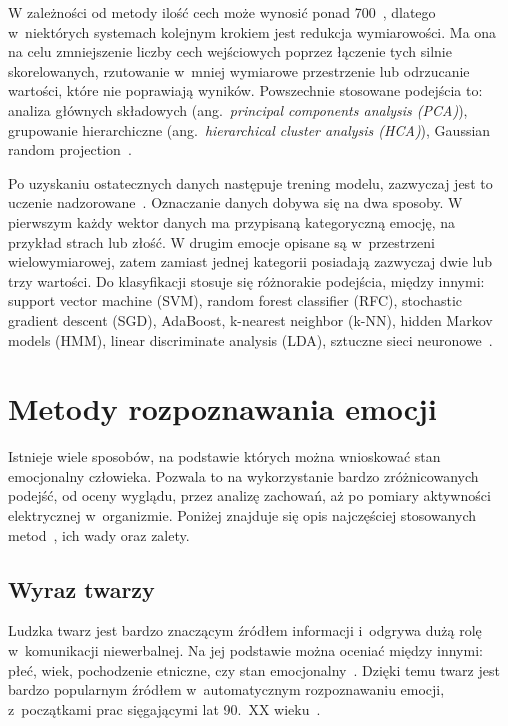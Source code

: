 W zależności od metody ilość cech może wynosić ponad 700~\cite{Wood2022}, dlatego w~niektórych systemach kolejnym krokiem jest redukcja wymiarowości.
Ma ona na celu zmniejszenie liczby cech wejściowych poprzez łączenie tych silnie skorelowanych, rzutowanie w~mniej wymiarowe przestrzenie lub odrzucanie wartości, które nie poprawiają wyników.
Powszechnie stosowane podejścia to: analiza głównych składowych (ang.~\textit{principal components analysis (PCA)}), grupowanie hierarchiczne (ang.~\textit{hierarchical cluster analysis (HCA)}), Gaussian random projection~\cite{Geron2019}.

Po uzyskaniu ostatecznych danych następuje trening modelu, zazwyczaj jest to uczenie nadzorowane~\cite{Russell2020}.
Oznaczanie danych dobywa się na dwa sposoby.
W pierwszym każdy wektor danych ma przypisaną kategoryczną emocję, na przykład strach lub złość.
W drugim emocje opisane są w~przestrzeni wielowymiarowej, zatem zamiast jednej kategorii posiadają zazwyczaj dwie lub trzy wartości.
Do klasyfikacji stosuje się różnorakie podejścia, między innymi: support vector machine (SVM), random forest classifier (RFC), stochastic gradient descent (SGD), AdaBoost, k-nearest neighbor (k-NN), hidden Markov models (HMM), linear discriminate analysis (LDA), sztuczne sieci neuronowe~\cite{Varghese2015, Dzedzickis2020, Ko2018}.

\section{Metody rozpoznawania emocji}
\label{sec:metody-rozpoznawania-emocji}

Istnieje wiele sposobów, na podstawie których można wnioskować stan emocjonalny człowieka.
Pozwala to na wykorzystanie bardzo zróżnicowanych podejść, od oceny wyglądu, przez analizę zachowań, aż po pomiary aktywności elektrycznej w~organizmie.
Poniżej znajduje się opis najczęściej stosowanych metod~\cite{Varghese2015, Dzedzickis2020}, ich wady oraz zalety.

\subsection{Wyraz twarzy}\label{subsec:wyraz-twarzy}
Ludzka twarz jest bardzo znaczącym źródłem informacji i~odgrywa dużą rolę w~komunikacji niewerbalnej.
Na jej podstawie można oceniać między innymi: płeć, wiek, pochodzenie etniczne, czy stan emocjonalny~\cite{Calvo2015}.
Dzięki temu twarz jest bardzo popularnym źródłem w~automatycznym rozpoznawaniu emocji, z~początkami prac sięgającymi lat 90.\ XX wieku~\cite{Calvo2015}.

